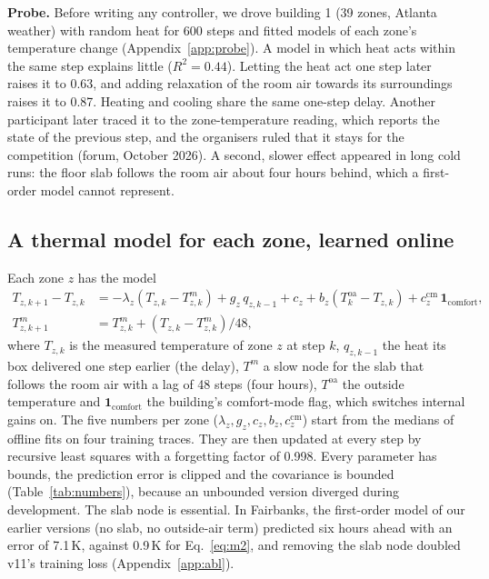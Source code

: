 \documentclass{article}
\begin{document}
\textbf{Probe.} Before writing any controller, we drove building 1 (39 zones, Atlanta weather) with random heat for
600 steps and fitted models of each zone's temperature change (Appendix~\ref{app:probe}). A model in which heat
acts within the same step explains little ($R^2=0.44$). Letting the heat act one step later raises it to 0.63, and
adding relaxation of the room air towards its surroundings raises it to 0.87. Heating and cooling share the same
one-step delay. Another participant later traced it to the zone-temperature reading, which reports the state of the
previous step, and the organisers ruled that it stays for the competition (forum, October 2026). A second, slower
effect appeared in long cold runs: the floor slab follows the room air about four hours behind, which a first-order
model cannot represent.

\subsection{A thermal model for each zone, learned online}\label{sec:model}
Each zone $z$ has the model
\begin{equation}\label{eq:m2}
\begin{aligned}
T_{z,k+1}-T_{z,k} &= -\lambda_z (T_{z,k} - T^{m}_{z,k}) + g_z\, q_{z,k-1} + c_z + b_z (T^{\mathrm{oa}}_k - T_{z,k})
  + c^{\mathrm{cm}}_z\, \mathbf{1}_{\mathrm{comfort}},\\
T^{m}_{z,k+1} &= T^{m}_{z,k} + (T_{z,k} - T^{m}_{z,k})/48,
\end{aligned}
\end{equation}
where $T_{z,k}$ is the measured temperature of zone $z$ at step $k$, $q_{z,k-1}$ the heat its box delivered one step earlier (the
delay), $T^{m}$ a slow node for the slab that follows the room air with a lag of 48 steps (four hours),
$T^{\mathrm{oa}}$ the outside temperature and $\mathbf{1}_{\mathrm{comfort}}$ the building's comfort-mode flag, which
switches internal gains on. The five numbers per zone ($\lambda_z, g_z, c_z, b_z, c^{\mathrm{cm}}_z$) start from the
medians of offline fits on four training traces. They are then updated at every step by recursive least squares with
a forgetting factor of 0.998. Every parameter has bounds, the prediction error is clipped and the covariance is
bounded (Table~\ref{tab:numbers}), because an unbounded version diverged during development. The slab node is
essential. In Fairbanks, the first-order model of our earlier versions (no slab, no outside-air term) predicted six
hours ahead with an error of 7.1\,K, against 0.9\,K for Eq.~\ref{eq:m2}, and removing the slab node doubled v11's
training loss (Appendix~\ref{app:abl}).
\end{document}

